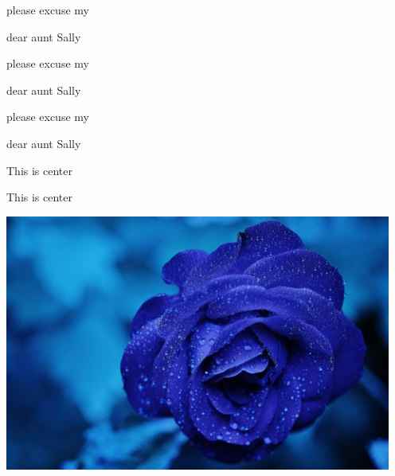 \documentclass[11pt]{article}
\begin{document}
please excuse my \begin{Large}
  dear aunt Sally
\end{Large}

please excuse my \begin{huge}
  dear aunt Sally
\end{huge}

please excuse my \begin{Huge}
  dear aunt Sally
\end{Huge}

\begin{center}
  This is center
\end{center}

\begin{flushleft}
  This is center
\end{flushleft}

\begin{center}
  \includegraphics[width=5in,angle=45]{rose.jpeg}
\end{center}
\end{document}
